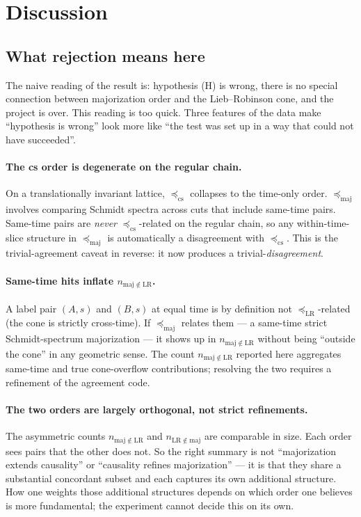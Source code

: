 \documentclass[11pt,a4paper]{article}
\theoremstyle{definition}
\theoremstyle{plain}
\theoremstyle{remark}
\newcommand{\maj}{\mathrm{maj}}
\newcommand{\LR}{\mathrm{LR}}
\newcommand{\cs}{\mathrm{cs}}
\begin{document}
\section{Discussion}\label{sec:discussion}

\subsection{What rejection means here}

The naive reading of the result is: hypothesis (H) is wrong, there is
no special connection between majorization order and the Lieb--Robinson
cone, and the project is over.  This reading is too quick.  Three
features of the data make ``hypothesis is wrong'' look more like ``the
test was set up in a way that could not have succeeded''.

\paragraph{The cs order is degenerate on the regular chain.}
On a translationally invariant lattice, $\preceq_{\cs}$ collapses to
the time-only order.  $\preceq_{\maj}$ involves comparing Schmidt
spectra across cuts that include same-time pairs.  Same-time pairs are
\emph{never} $\preceq_{\cs}$-related on the regular chain, so any
within-time-slice structure in $\preceq_{\maj}$ is automatically a
disagreement with $\preceq_{\cs}$.  This is the trivial-agreement
caveat in reverse: it now produces a trivial-\emph{disagreement}.

\paragraph{Same-time hits inflate $n_{\maj \notin \LR}$.}
A label pair $(A, s)$ and $(B, s)$ at equal time is by definition
not $\preceq_{\LR}$-related (the cone is strictly cross-time).  If
$\preceq_{\maj}$ relates them --- a same-time strict
Schmidt-spectrum majorization --- it shows up in $n_{\maj \notin \LR}$
without being ``outside the cone'' in any geometric sense.  The count
$n_{\maj \notin \LR}$ reported here aggregates same-time and true
cone-overflow contributions; resolving the two requires a refinement
of the agreement code.

\paragraph{The two orders are largely orthogonal, not strict refinements.}
The asymmetric counts $n_{\maj \notin \LR}$ and
$n_{\LR \notin \maj}$ are comparable in size.  Each order sees pairs
that the other does not.  So the right summary is not ``majorization
extends causality'' or ``causality refines majorization'' --- it is
that they share a substantial concordant subset and each captures
its own additional structure.  How one weights those additional
structures depends on which order one believes is more fundamental;
the experiment cannot decide this on its own.
\end{document}
